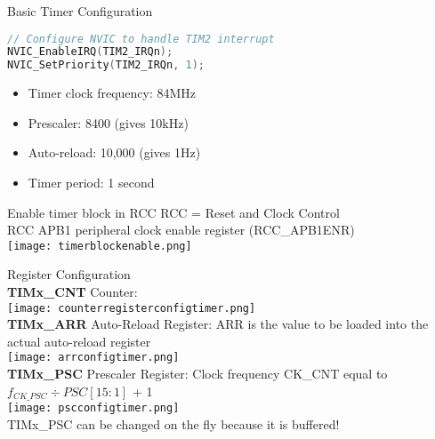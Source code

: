 \begin{KR}{Basic Timer Configuration}
\begin{lstlisting}[language=C, style=basesmol]
// Configure NVIC to handle TIM2 interrupt
NVIC_EnableIRQ(TIM2_IRQn);
NVIC_SetPriority(TIM2_IRQn, 1);
\end{lstlisting}

\begin{itemize}
    \item Timer clock frequency: 84MHz
    \item Prescaler: 8400 (gives 10kHz)
    \item Auto-reload: 10,000 (gives 1Hz)
    \item Timer period: 1 second
\end{itemize}
\end{KR}

\raggedcolumns
\columnbreak

\begin{concept}{Enable timer block in RCC} RCC = Reset and Clock Control\\
    RCC APB1 peripheral clock enable register (RCC\_APB1ENR)\\
    \texttt{[image: timerblockenable.png]}
\end{concept}



\begin{theorem}{Register Configuration}\\
    \textbf{TIMx\_CNT} Counter:\\
    \texttt{[image: counterregisterconfigtimer.png]}
    \vspace{1mm}\\
    \textbf{TIMx\_ARR} Auto-Reload Register: ARR is the value to be loaded into the actual auto-reload register\\
    \texttt{[image: arrconfigtimer.png]}
    \vspace{1mm}\\
    \textbf{TIMx\_PSC} Prescaler Register: Clock frequency CK\_CNT equal to $f_{CK\_PSC} \div PSC[15:1]$ + 1\\
    \texttt{[image: pscconfigtimer.png]}\\
    TIMx\_PSC can be changed on the fly because it is buffered!
\end{theorem}

